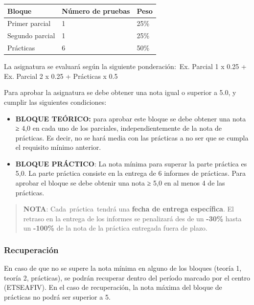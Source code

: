 \documentclass[
  letterpaper,
  DIV=11,
  numbers=noendperiod]{scrreprt}
\begin{document}
\begin{longtable}[]{@{}lll@{}}
\toprule\noalign{}
Bloque & Número de pruebas & Peso \\
\midrule\noalign{}
\endhead
\bottomrule\noalign{}
\endlastfoot
Primer parcial & 1 & 25\% \\
Segundo parcial & 1 & 25\% \\
Prácticas & 6 & 50\% \\
\end{longtable}

La asignatura se evaluará según la siguiente ponderación:~Ex. Parcial 1
x 0.25 + Ex. Parcial 2 x 0.25 + Prácticas x 0.5

Para aprobar la asignatura se debe obtener una nota igual o superior a
5.0, y cumplir las siguientes condiciones:

\begin{itemize}
\item
  \textbf{BLOQUE TEÓRICO:} para aprobar este bloque se debe obtener una
  nota ≥ 4,0 en cada uno de los parciales, independientemente de la nota
  de prácticas. Es decir, no se hará media con las prácticas a no ser
  que se cumpla el requisito mínimo anterior.~
\item
  \textbf{BLOQUE PRÁCTICO}: La nota mínima para superar la parte
  práctica es 5,0. La parte práctica consiste en la entrega de 6
  informes de prácticas. Para aprobar el bloque se debe obtenir una nota
  ≥ 5,0 en al menos 4 de las prácticas.~
\end{itemize}

\begin{quote}
\textbf{NOTA}: Cada~práctica~tendrá una \textbf{fecha de entrega
específica}. El retraso en la entrega de los informes se penalizará des
de un \textbf{-30\%} hasta un \textbf{-100\%} de la nota de la práctica
entregada fuera de plazo.
\end{quote}

\hypertarget{recuperaciuxf3n}{%
\subsubsection*{\texorpdfstring{\textbf{Recuperación}}{Recuperación}}\label{recuperaciuxf3n}}

En caso de que no se supere la nota mínima en alguno de los bloques
(teoría 1, teoría 2, prácticas), se podrán recuperar dentro del período
marcado por el centro (ETSEAFIV). En el caso de recuperación, la nota
máxima del bloque de prácticas no podrá ser superior a 5.
\end{document}
